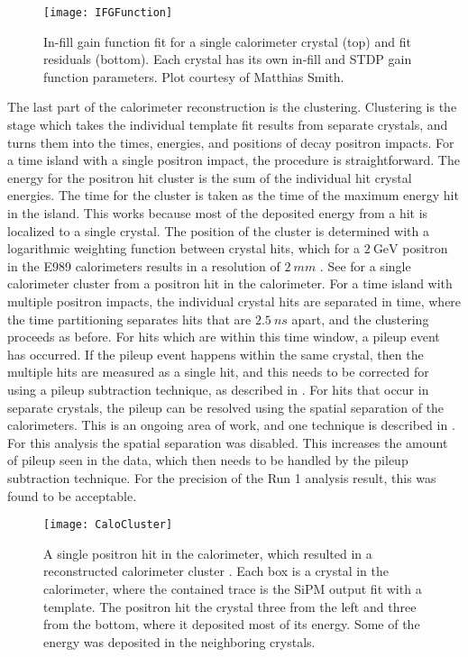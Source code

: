 \begin{figure}
    \centering
    \texttt{[image: IFGFunction]}
    \caption[In-fill gain function fit for a single calorimeter crystal]{In-fill gain function fit for a single calorimeter crystal (top) and fit residuals (bottom). Each crystal has its own in-fill and STDP gain function parameters. Plot courtesy of Matthias Smith.}
    \label{fig:IFGFunction}
\end{figure}


The last part of the calorimeter reconstruction is the clustering. Clustering is the stage which takes the individual template fit results from separate crystals, and turns them into the times, energies, and positions of decay positron impacts. For a time island with a single positron impact, the procedure is straightforward. The energy for the positron hit cluster is the sum of the individual hit crystal energies. The time for the cluster is taken as the time of the maximum energy hit in the island. This works because most of the deposited energy from a hit is localized to a single crystal. The position of the cluster is determined with a logarithmic weighting function between crystal hits, which for a $\SI{2}{\GeV}$ positron in the E989 calorimeters results in a resolution of $\SI{2}{mm}$ \cite{AFThesis}. See  for a single calorimeter cluster from a positron hit in the calorimeter. For a time island with multiple positron impacts, the individual crystal hits are separated in time, where the time partitioning separates hits that are $\SI{2.5}{ns}$ apart, and the clustering proceeds as before. For hits which are within this time window, a pileup event has occurred. If the pileup event happens within the same crystal, then the multiple hits are measured as a single hit, and this needs to be corrected for using a pileup subtraction technique, as described in . For hits that occur in separate crystals, the pileup can be resolved using the spatial separation of the calorimeters. This is an ongoing area of work, and one technique is described in . For this analysis the spatial separation was disabled. This increases the amount of pileup seen in the data, which then needs to be handled by the pileup subtraction technique. For the precision of the Run 1 analysis result, this was found to be acceptable. 


\begin{figure}
    \centering
    \texttt{[image: CaloCluster]}
    \caption[Calorimeter cluster from SiPM traces fit with templates]{A single positron hit in the calorimeter, which resulted in a reconstructed calorimeter cluster \cite{AFThesis}. Each box is a crystal in the calorimeter, where the contained trace is the SiPM output fit with a template. The positron hit the crystal three from the left and three from the bottom, where it deposited most of its energy. Some of the energy was deposited in the neighboring crystals.}
    \label{fig:CaloCluster}
\end{figure}




